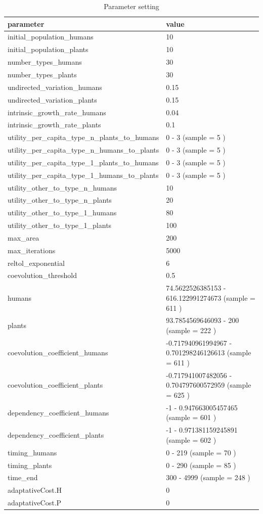 \documentclass[
]{book}
\begin{document}
\begin{table}[!h]

\caption{\label{tab:4mUHPmUPHtablepdf}Parameter setting}
\centering
\begin{tabular}[t]{l|l}
\hline
parameter & value\\
\hline
initial\_population\_humans & 10\\
\hline
initial\_population\_plants & 10\\
\hline
number\_types\_humans & 30\\
\hline
number\_types\_plants & 30\\
\hline
undirected\_variation\_humans & 0.15\\
\hline
undirected\_variation\_plants & 0.15\\
\hline
intrinsic\_growth\_rate\_humans & 0.04\\
\hline
intrinsic\_growth\_rate\_plants & 0.1\\
\hline
utility\_per\_capita\_type\_n\_plants\_to\_humans & 0 - 3 (sample = 5 )\\
\hline
utility\_per\_capita\_type\_n\_humans\_to\_plants & 0 - 3 (sample = 5 )\\
\hline
utility\_per\_capita\_type\_1\_plants\_to\_humans & 0 - 3 (sample = 5 )\\
\hline
utility\_per\_capita\_type\_1\_humans\_to\_plants & 0 - 3 (sample = 5 )\\
\hline
utility\_other\_to\_type\_n\_humans & 10\\
\hline
utility\_other\_to\_type\_n\_plants & 20\\
\hline
utility\_other\_to\_type\_1\_humans & 80\\
\hline
utility\_other\_to\_type\_1\_plants & 100\\
\hline
max\_area & 200\\
\hline
max\_iterations & 5000\\
\hline
reltol\_exponential & 6\\
\hline
coevolution\_threshold & 0.5\\
\hline
humans & 74.5622526385153 - 616.122991274673 (sample = 611 )\\
\hline
plants & 93.7854569646093 - 200 (sample = 222 )\\
\hline
coevolution\_coefficient\_humans & -0.717940961994967 - 0.701298246126613 (sample = 611 )\\
\hline
coevolution\_coefficient\_plants & -0.717941007482056 - 0.704797600572959 (sample = 625 )\\
\hline
dependency\_coefficient\_humans & -1 - 0.947663005457465 (sample = 601 )\\
\hline
dependency\_coefficient\_plants & -1 - 0.971381159245891 (sample = 602 )\\
\hline
timing\_humans & 0 - 219 (sample = 70 )\\
\hline
timing\_plants & 0 - 290 (sample = 85 )\\
\hline
time\_end & 300 - 4999 (sample = 248 )\\
\hline
adaptativeCost.H & 0\\
\hline
adaptativeCost.P & 0\\
\hline
\end{tabular}
\end{table}
\end{document}

